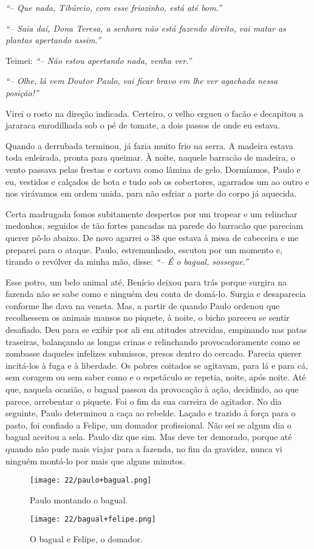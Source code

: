 \textit{``-- Que nada, Tibúrcio, com esse friozinho, está até bom.''}

\textit{``-- Saia daí, Dona Teresa, a senhora não está fazendo direito, vai matar as plantas apertando assim.''}

Teimei:
\textit{``-- Não estou apertando nada, venha ver.''}

\textit{``-- Olhe, lá vem Doutor Paulo, vai ficar bravo em lhe ver agachada nessa posição!''}

Virei o rosto na direção indicada.
Certeiro, o velho ergueu o facão e decapitou a jararaca enrodilhada sob o pé de tomate, a dois passos de onde eu estava.

Quando a derrubada terminou, já fazia muito frio na serra.
A madeira estava toda enleirada, pronta para queimar.
À noite, naquele barracão de madeira, o vento passava pelas frestas e cortava como lâmina de gelo.
Dormíamos, Paulo e eu, vestidos e calçados de bota e tudo sob os cobertores, agarrados um ao outro e nos virávamos em ordem unida, para não esfriar a parte do corpo já aquecida.


Certa madrugada fomos subitamente despertos por um tropear e um relinchar medonhos, seguidos de tão fortes pancadas na parede do barracão que pareciam querer pô-lo abaixo.
De novo agarrei o 38 que estava à mesa de cabeceira e me preparei para o ataque.
Paulo, estremunhado, escutou por um momento e, tirando o revólver da minha mão, disse:
\textit{``-- É o bagual, sossegue.''}

Esse potro, um belo animal até, Benício deixou para trás porque surgira na fazenda não se sabe como e ninguém deu conta de domá-lo.
Surgia e desaparecia conforme lhe dava na veneta.
Mas, a partir de quando Paulo ordenou que recolhessem os animais mansos no piquete, à noite, o bicho pareceu se sentir desafiado.
Deu para se exibir por ali em atitudes atrevidas, empinando nas patas traseiras, balançando as longas crinas e relinchando provocadoramente como se zombasse daqueles infelizes submissos, presos dentro do cercado.
Parecia querer incitá-los à fuga e à liberdade.
Os pobres coitados se agitavam, para lá e para cá, sem coragem ou sem saber como e o espetáculo se repetia, noite, após noite.
Até que, naquela ocasião, o bagual passou da provocação à ação, decidindo, ao que parece, arrebentar o piquete.
Foi o fim da sua carreira de agitador.
No dia seguinte, Paulo determinou a caça ao rebelde.
Laçado e trazido à força para o pasto, foi confiado a Felipe, um domador profissional.
Não sei se algum dia o bagual aceitou a sela.
Paulo diz que sim.
Mas deve ter demorado, porque até quando não pude mais viajar para a fazenda, no fim da gravidez, nunca vi ninguém montá-lo por mais que alguns minutos.

\begin{figure}
\centering
\texttt{[image: 22/paulo+bagual.png]}
\caption{Paulo montando o bagual.}
\end{figure}

\begin{figure}
\centering
\texttt{[image: 22/bagual+felipe.png]}
\caption{O bagual e Felipe, o domador.}
\end{figure}